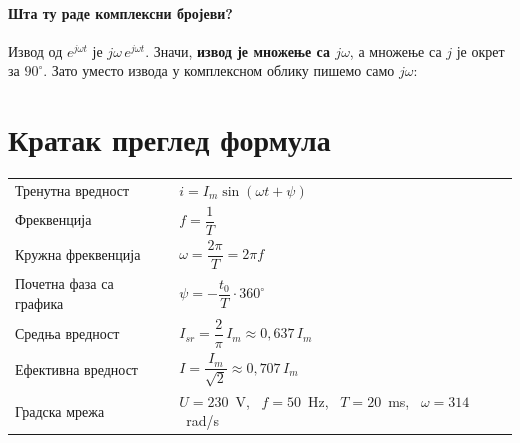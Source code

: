 \documentclass{article}
\begin{document}
\paragraph{Шта ту раде комплексни бројеви?} Извод од $e^{j\omega t}$ је $j\omega\,e^{j\omega t}$. Значи, \textbf{извод је множење са $j\omega$}, а множење са $j$ је окрет за $90^\circ$. Зато уместо извода у комплексном облику пишемо само $j\omega$:


\section*{Кратак преглед формула}

\begin{kljucno}
\renewcommand{\arraystretch}{2.3}
\begin{tabular}{ll}
    Тренутна вредност       & $i = I_m\sin(\omega t + \psi)$ \\
    Фреквенција             & $f = \dfrac{1}{T}$ \\
    Кружна фреквенција      & $\omega = \dfrac{2\pi}{T} = 2\pi f$ \\
    Почетна фаза са графика & $\psi = -\dfrac{t_0}{T}\cdot 360^\circ$ \\
    Средња вредност         & $I_{sr} = \dfrac{2}{\pi}\,I_m \approx 0{,}637\,I_m$ \\
    Ефективна вредност      & $I = \dfrac{I_m}{\sqrt{2}} \approx 0{,}707\,I_m$ \\
    Градска мрежа           & $U = 230$~V, \ $f = 50$~Hz, \ $T = 20$~ms, \ $\omega = 314$~rad/s \\
\end{tabular}
\end{kljucno}
\end{document}
